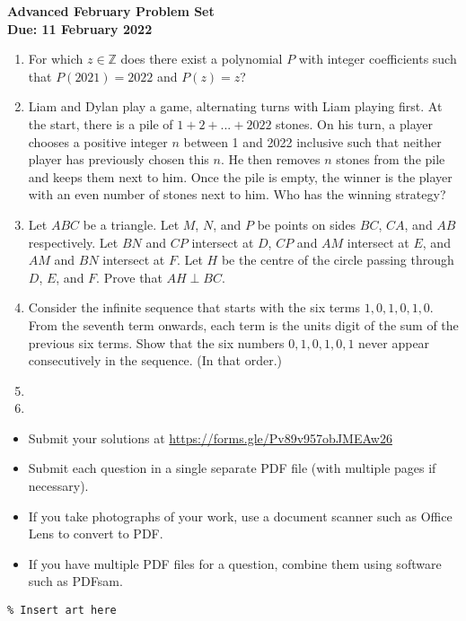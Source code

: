 \documentclass{article}
\begin{document}
\thispagestyle{empty}

\begin{center}
  \textbf{\Large Advanced February Problem Set}
  \\ \vspace{1em}
  \textbf{\large Due: 11 February 2022}
\end{center}

\bigskip

\begin{enumerate}[itemsep=\fill]

\item %
For which $z \in \mathbb{Z}$ does there exist a polynomial $P$ with integer coefficients such that $P(2021)=2022$ and $P(z)=z$?
	
\item %
Liam and Dylan play a game, alternating turns with Liam playing first. At the start, there is a pile of $1+2+...+2022$ stones. On his turn, a player chooses a positive integer $n$ between 1 and 2022 inclusive such that neither player has previously chosen this $n$. He then removes $n$ stones from the pile and keeps them next to him. Once the pile is empty, the winner is the player with an even number of stones next to him. Who has the winning strategy? 


\item %
Let $ABC$ be a triangle.
Let $M$, $N$, and $P$ be points on sides $BC$, $CA$, and $AB$ respectively.
Let $BN$ and $CP$ intersect at $D$, $CP$ and $AM$ intersect at $E$, and $AM$ and $BN$ intersect at $F$.
Let $H$ be the centre of the circle passing through $D$, $E$, and $F$.
Prove that $AH \perp BC$.


\item %
Consider the infinite sequence that starts with the six terms $1, 0, 1, 0, 1, 0$. From the seventh term onwards, each term is the units digit of the sum of the previous six terms. Show that the six numbers $0, 1, 0, 1, 0, 1$ never appear consecutively in the sequence. (In that order.)


\item %


\item %

\end{enumerate}


\vfill
\small
\begin{itemize}
	\item Submit your solutions at \href{https://forms.gle/Pv89v957obJMEAw26}{https://forms.gle/Pv89v957obJMEAw26}
	\item Submit each question in a single separate PDF file (with multiple pages if necessary).
	\item If you take photographs of your work, use a document scanner such as Office Lens to convert to PDF.
	\item If you have multiple PDF files for a question, combine them using software such as PDFsam.
\end{itemize}

\vfill
\centering
\small
\begin{BVerbatim}
\end{BVerbatim}
\end{document}
